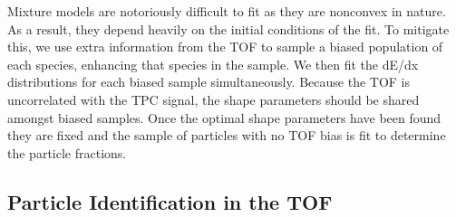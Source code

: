 Mixture models are notoriously difficult to fit as they are nonconvex in nature. As a result, they depend heavily on the initial conditions of the fit. To mitigate this, we use extra information from the TOF to sample a biased population of each species, enhancing that species in the sample. We then fit the dE/dx distributions for each biased sample simultaneously. Because the TOF is uncorrelated with the TPC signal, the shape parameters should be shared amongst biased samples. Once the optimal shape parameters have been found they are fixed and the sample of particles with no TOF bias is fit to determine the particle fractions.

\subsection*{Particle Identification in the TOF}
